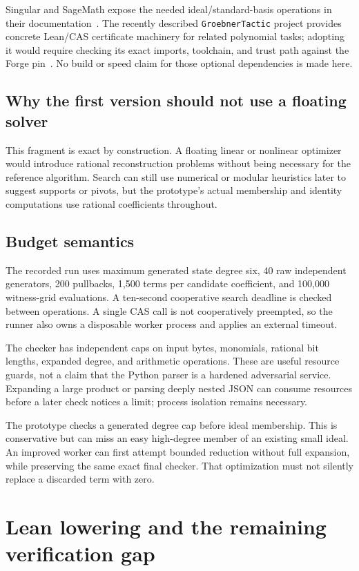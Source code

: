 \documentclass[11pt,letterpaper]{article}
\theoremstyle{definition}
\newcommand{\code}[1]{\nolinkurl{#1}}
\begin{document}
Singular and SageMath expose the needed ideal/standard-basis operations in their
documentation~\cite{singular-lift,sage-ideals}. The recently described
\code{GroebnerTactic} project provides concrete Lean/CAS certificate machinery
for related polynomial tasks; adopting it would require checking its exact
imports, toolchain, and trust path against the Forge pin~\cite{groebner-tactics}.
No build or speed claim for those optional dependencies is made here.

\subsection{Why the first version should not use a floating solver}
This fragment is exact by construction. A floating linear or nonlinear optimizer
would introduce rational reconstruction problems without being necessary for
the reference algorithm. Search can still use numerical or modular heuristics
later to suggest supports or pivots, but the prototype's actual membership and
identity computations use rational coefficients throughout.

\subsection{Budget semantics}
The recorded run uses maximum generated state degree six, 40 raw independent
generators, 200 pullbacks, 1,500 terms per candidate coefficient, and 100,000
witness-grid evaluations. A ten-second cooperative search deadline is checked
between operations. A single CAS call is not cooperatively preempted, so the
runner also owns a disposable worker process and applies an external timeout.

The checker has independent caps on input bytes, monomials, rational bit lengths,
expanded degree, and arithmetic operations. These are useful resource guards,
not a claim that the Python parser is a hardened adversarial service. Expanding
a large product or parsing deeply nested JSON can consume resources before a
later check notices a limit; process isolation remains necessary.

The prototype checks a generated degree cap before ideal membership. This is
conservative but can miss an easy high-degree member of an existing small ideal.
An improved worker can first attempt bounded reduction without full expansion,
while preserving the same exact final checker. That optimization must not
silently replace a discarded term with zero.

\section{Lean lowering and the remaining verification gap}
\label{sec:lean}
\end{document}
